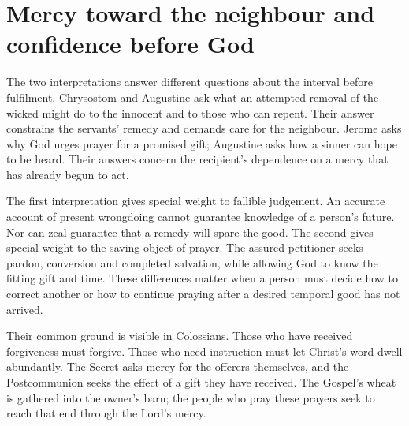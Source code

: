 \section{Mercy toward the neighbour and confidence before God}
The two interpretations answer different questions about the interval
before fulfilment. Chrysostom and Augustine ask what an attempted removal
of the wicked might do to the innocent and to those who can repent.
Their answer constrains the servants' remedy and demands care for the
neighbour. Jerome asks why God urges prayer for a promised gift;
Augustine asks how a sinner can hope to be heard. Their answers concern
the recipient's dependence on a mercy that has already begun to act.

The first interpretation gives special weight to fallible judgement.
An accurate account of present wrongdoing cannot guarantee knowledge of
a person's future. Nor can zeal guarantee that a remedy will spare the
good. The second gives special weight to the saving object of prayer.
The assured petitioner seeks pardon, conversion and completed salvation,
while allowing God to know the fitting gift and time. These differences
matter when a person must decide how to correct another or how to continue
praying after a desired temporal good has not arrived.

Their common ground is visible in Colossians. Those who have received
forgiveness must forgive. Those who need instruction must let Christ's
word dwell abundantly. The Secret asks mercy for the offerers themselves,
and the Postcommunion seeks the effect of a gift they have received.
The Gospel's wheat is gathered into the owner's barn; the people who
pray these prayers seek to reach that end through the Lord's mercy.
